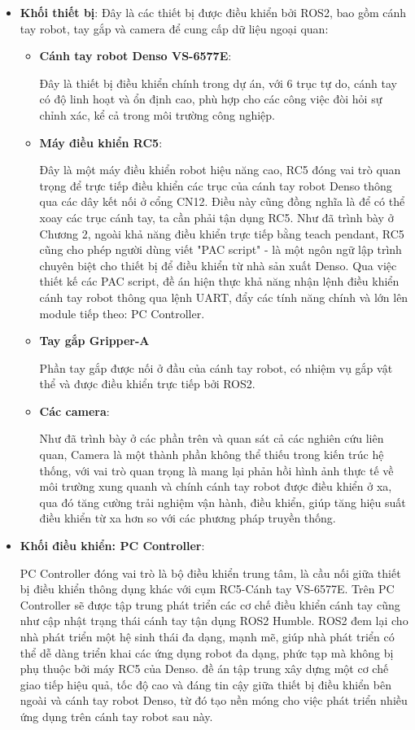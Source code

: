 \begin{itemize}
    \item \textbf{Khối thiết bị}: Đây là các thiết bị được điều khiển bởi ROS2, bao gồm cánh tay robot, tay gắp và camera để cung cấp dữ liệu ngoại quan:
    
    \begin{itemize}
    \item \textbf{Cánh tay robot Denso VS-6577E}: 
    
    Đây là thiết bị điều khiển chính trong dự án, với 6 trục tự do, cánh tay có độ linh hoạt và ổn định cao, phù hợp cho các công việc đòi hỏi sự chỉnh xác, kể cả trong môi trường công nghiệp.

    \item \textbf{Máy điều khiển RC5}:

    Đây là một máy điều khiển robot hiệu năng cao, RC5 đóng vai trò quan trọng để trực tiếp điều khiển các trục của cánh tay robot Denso thông qua các dây kết nối ở cổng CN12. Điều này cũng đồng nghĩa là để có thể xoay các trục cánh tay, ta cần phải tận dụng RC5. Như đã trình bày ở Chương 2, ngoài khả năng điều khiển trực tiếp bằng teach pendant, RC5 cũng cho phép người dùng viết "PAC script" - là một ngôn ngữ lập trình chuyên biệt cho thiết bị để điều khiển từ nhà sản xuất Denso. Qua việc thiết kế các PAC script, đề án hiện thực khả năng nhận lệnh điều khiển cánh tay robot thông qua lệnh UART, đẩy các tính năng chính và lớn lên module tiếp theo: PC Controller.

    \item \textbf{Tay gắp Gripper-A}
    
    Phần tay gắp được nối ở đầu của cánh tay robot, có nhiệm vụ gắp vật thể và được điều khiển trực tiếp bởi ROS2.

    \item \textbf{Các camera}:

    Như đã trình bày ở các phần trên và quan sát cả các nghiên cứu liên quan, Camera là một thành phần không thể thiếu trong kiến trúc hệ thống, với vai trò quan trọng là mang lại phản hồi hình ảnh thực tế về môi trường xung quanh và chính cánh tay robot được điều khiển ở xa, qua đó tăng cường trải nghiệm vận hành, điều khiển, giúp tăng hiệu suất điều khiển từ xa hơn so với các phương pháp truyền thống.


    \end{itemize}
    \item \textbf{Khối điều khiển: PC Controller}: 

    PC Controller đóng vai trò là bộ điều khiển trung tâm, là cầu nối giữa thiết bị điều khiển thông dụng khác với cụm RC5-Cánh tay VS-6577E. Trên PC Controller sẽ được tập trung phát triển các cơ chế điều khiển cánh tay cũng như cập nhật trạng thái cánh tay tận dụng ROS2 Humble. ROS2 đem lại cho nhà phát triển một hệ sinh thái đa dạng, mạnh mẽ, giúp nhà phát triển có thể dễ dàng triển khai các ứng dụng robot đa dạng, phức tạp mà không bị phụ thuộc bởi máy RC5 của Denso. đề án tập trung xây dựng một cơ chế giao tiếp hiệu quả, tốc độ cao và đáng tin cậy giữa thiết bị điều khiển bên ngoài và cánh tay robot Denso, từ đó tạo nền móng cho việc phát triển nhiều ứng dụng trên cánh tay robot sau này.


\end{itemize}
